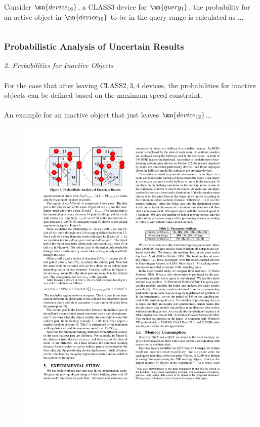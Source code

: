 \begin{frame}
\begin{columns}[c]
  Consider $\mn{device_{16}}$, a $\mathrm{CLASS3}$ device for $\mn{query_1}$, the probability for an active object in $\mn{device_{16}}$ to be in the query range is calculated as ...

\end{columns}

\end{frame}


\begin{frame}
\frametitle{Probabilistic Analysis of Uncertain Results}

\textit{2. Probabilities for Inactive Objects}
\\~\\
For the case that after leaving $\mathrm{CLASS2,3,4}$ devices, the probabilities for inactive objects can be defined based on the maximum speed constraint.
\\~\\
An example for an inactive object that just leaves $\mn{device_{12}}$...
\vspace{-5pt}
\begin{figure}[tb]
  \includegraphics[width=0.7\columnwidth]{figures/2-2/2-2-10.pdf}
\end{figure}

\end{frame}

